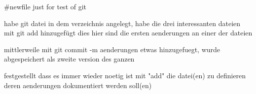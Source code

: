 #newfile just for test of git

habe git datei in dem verzeichnis angelegt,
habe die drei interessanten dateien mit git add hinzugefügt
dies hier sind die ersten aenderungen an einer der dateien

mittlerweile mit git commit -m aenderungen etwas hinzugefuegt, 
wurde abgespeichert als zweite version des ganzen

festgestellt dass es immer wieder noetig ist mit "add"
die datei(en) zu definieren deren aenderungen dokumentiert werden soll(en)